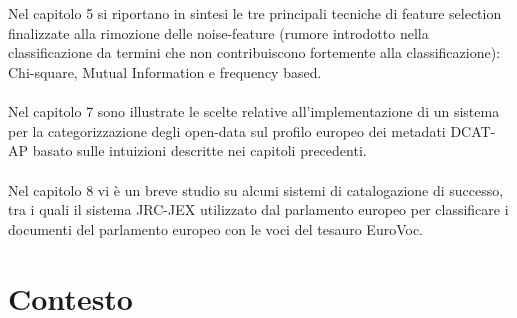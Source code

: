 \documentclass{article}
\theoremstyle{plain}
\theoremstyle{definition}
\begin{document}
\\
\\
Nel capitolo 5 si riportano in sintesi le tre principali tecniche di feature selection finalizzate alla rimozione delle noise-feature (rumore introdotto nella classificazione da termini che non contribuiscono fortemente alla classificazione): Chi-square, Mutual Information e frequency based.
\\
\\
Nel capitolo 7 sono illustrate le scelte relative all'implementazione di un sistema per la categorizzazione degli open-data sul profilo europeo dei metadati DCAT-AP basato sulle intuizioni descritte nei capitoli precedenti.
\\
\\
Nel capitolo 8 vi è un breve studio su alcuni sistemi di catalogazione di successo, tra i quali il sistema JRC-JEX utilizzato dal parlamento europeo per classificare i documenti del parlamento europeo con le voci del tesauro EuroVoc.


\newpage
\section{Contesto}
\end{document}
